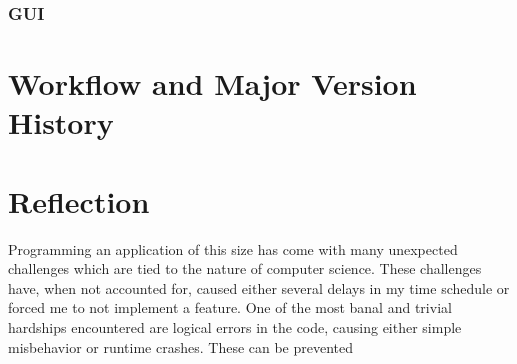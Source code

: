 \documentclass[10pt,a4paper,titlepage]{article}
\begin{document}
	\subsubsection{GUI}
	\section{Workflow and Major Version History}
	
	\section{Reflection}
	Programming an application of this size has come with many unexpected challenges which are tied to the nature of computer science. These challenges have, when not accounted for, caused either several delays in my time schedule or forced me to not implement a feature. One of the most banal and trivial hardships encountered are logical errors in the code, causing either simple misbehavior or runtime crashes. These can be prevented 
	
	
	
	
	
	
	
	
	
	
	\clearpage
	\appendix
	\printbibliography
\end{document}
